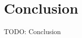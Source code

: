 \documentclass[../main.tex]{subfiles}
\begin{document}
\section{Conclusion}
\label{sec:conclusion}
TODO: Conclusion
\end{document}
